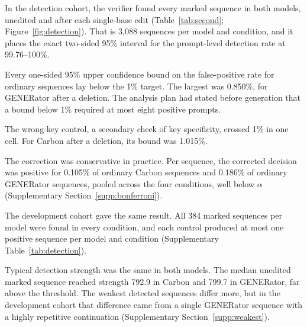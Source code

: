 \documentclass[10pt,twocolumn]{article}
\begin{document}
In the detection cohort, the verifier found every marked sequence in both models, unedited and after
each single-base edit (Table~\ref{tab:second}; Figure~\ref{fig:detection}). That is 3{,}088 sequences
per model and condition, and it places the exact two-sided 95\% interval for the prompt-level
detection rate at 99.76--100\%.

Every one-sided 95\% upper confidence bound on the false-positive rate for ordinary sequences lay below
the 1\% target. The largest was 0.850\%, for GENERator after a deletion. The analysis plan had
stated before generation that a bound below 1\% required at most eight positive prompts.

The wrong-key control, a secondary check of key specificity, crossed 1\% in one cell. For Carbon
after a deletion, its bound was 1.015\%.

The correction was conservative in practice. Per sequence, the corrected decision was positive for
0.105\% of ordinary Carbon sequences and 0.186\% of ordinary GENERator sequences, pooled across the four
conditions, well below $\alpha$ (Supplementary Section~\ref{supp:bonferroni}).

The development cohort gave the same result. All 384 marked sequences per model were found in every
condition, and each control produced at most one positive sequence per model and condition
(Supplementary Table~\ref{tab:detection}).

Typical detection strength was the same in both models. The median unedited marked sequence reached
strength 792.9 in Carbon and 799.7 in GENERator, far above the threshold. The weakest detected sequences
differ more, but in the development cohort that difference came from a single GENERator sequence
with a highly repetitive continuation (Supplementary Section~\ref{supp:weakest}).
\end{document}
